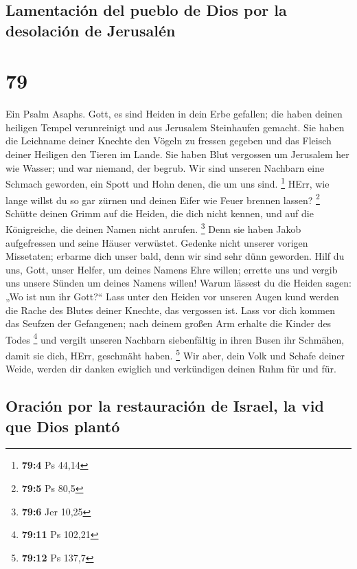 \hypertarget{lamentaciuxf3n-del-pueblo-de-dios-por-la-desolaciuxf3n-de-jerusaluxe9n}{%
\subsection{Lamentación del pueblo de Dios por la desolación de
Jerusalén}\label{lamentaciuxf3n-del-pueblo-de-dios-por-la-desolaciuxf3n-de-jerusaluxe9n}}

\hypertarget{section-78}{%
\section{79}\label{section-78}}

 Ein Psalm Asaphs. Gott, es sind Heiden in dein Erbe
gefallen; die haben deinen heiligen Tempel verunreinigt und aus
Jerusalem Steinhaufen gemacht.  Sie haben die Leichname
deiner Knechte den Vögeln zu fressen gegeben und das Fleisch deiner
Heiligen den Tieren im Lande.  Sie haben Blut vergossen um
Jerusalem her wie Wasser; und war niemand, der begrub. 
Wir sind unseren Nachbarn eine Schmach geworden, ein Spott und Hohn
denen, die um uns sind. \footnote{\textbf{79:4} Ps 44,14} 
HErr, wie lange willst du so gar zürnen und deinen Eifer wie Feuer
brennen lassen? \footnote{\textbf{79:5} Ps 80,5}  Schütte
deinen Grimm auf die Heiden, die dich nicht kennen, und auf die
Königreiche, die deinen Namen nicht anrufen. \footnote{\textbf{79:6} Jer
  10,25}  Denn sie haben Jakob aufgefressen und seine
Häuser verwüstet.  Gedenke nicht unserer vorigen
Missetaten; erbarme dich unser bald, denn wir sind sehr dünn geworden.
 Hilf du uns, Gott, unser Helfer, um deines Namens Ehre
willen; errette uns und vergib uns unsere Sünden um deines Namens
willen!  Warum lässest du die Heiden sagen: „Wo ist nun
ihr Gott?{}`` Lass unter den Heiden vor unseren Augen kund werden die
Rache des Blutes deiner Knechte, das vergossen ist.  Lass
vor dich kommen das Seufzen der Gefangenen; nach deinem großen Arm
erhalte die Kinder des Todes \footnote{\textbf{79:11} Ps 102,21}
 und vergilt unseren Nachbarn siebenfältig in ihren Busen
ihr Schmähen, damit sie dich, HErr, geschmäht haben. \footnote{\textbf{79:12}
  Ps 137,7}  Wir aber, dein Volk und Schafe deiner Weide,
werden dir danken ewiglich und verkündigen deinen Ruhm für und für.

\hypertarget{oraciuxf3n-por-la-restauraciuxf3n-de-israel-la-vid-que-dios-plantuxf3}{%
\subsection{Oración por la restauración de Israel, la vid que Dios
plantó}\label{oraciuxf3n-por-la-restauraciuxf3n-de-israel-la-vid-que-dios-plantuxf3}}


